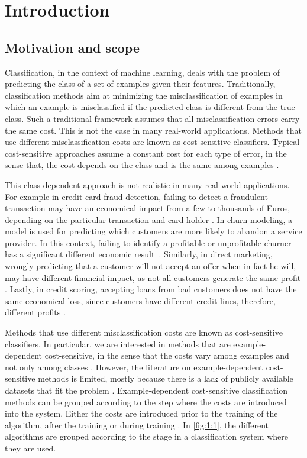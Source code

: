\chapter{Introduction}\label{ch:1}

\section{Motivation and scope}

  Classification, in the context of machine learning, deals with the problem of 
  predicting the class of a set of examples given their features. Traditionally, classification 
  methods aim at minimizing the misclassification of examples in which an example is 
  misclassified if the predicted class is different from the true class. Such a traditional 
  framework assumes that all misclassification errors carry the same cost. This is not the case in 
  many real-world applications. Methods that use different misclassification costs are known as 
  cost-sensitive classifiers. Typical cost-sensitive approaches assume a constant cost for each 
  type of error, in the sense that, the cost depends on the class and is the same among examples 
  \citep{Elkan2001,Kim2012}. 
  
  This class-dependent approach is not realistic in many real-world applications. For 
  example in credit card fraud detection, failing to detect a fraudulent transaction may have an 
  economical impact from a few to thousands of Euros, depending on the particular transaction and 
  card holder \citep{Ngai2011a}. In churn modeling, a model is used for predicting which
  customers are more likely to abandon a service provider. In this context, failing to identify a 
  profitable or unprofitable churner has a significant different economic 
  result~\citep{Verbraken2013}. Similarly, in direct marketing, wrongly predicting that a customer 
  will not accept an offer when in fact he will, may have different financial impact, as not all 
  customers generate the same profit \citep{Zadrozny2003}. Lastly, in credit scoring, accepting 
  loans from bad customers does not have the same economical loss, since customers have different 
  credit lines, therefore, different profits \citep{Verbraken2014}.
  
  Methods that use different misclassification costs are known as cost-sensitive classifiers. In 
  particular, we are interested in methods that are example-dependent cost-sensitive, in the sense 
  that the costs vary among examples and not only among classes \citep{Elkan2001}. However, the 
  literature on example-dependent cost-sensitive methods is limited, mostly because there is a 
  lack of publicly available datasets that fit the problem \citep{MacAodha2013}.
  Example-dependent cost-sensitive classification methods can be grouped according to the step 
  where the costs are introduced into the system. Either the costs are introduced prior to the 
  training of the algorithm, after the training or during training \citep{Wang2013}. In 
  \figurename{ \ref{fig:1:1}}, the different algorithms are grouped according to the stage in a 
  classification system where they are used.
  
